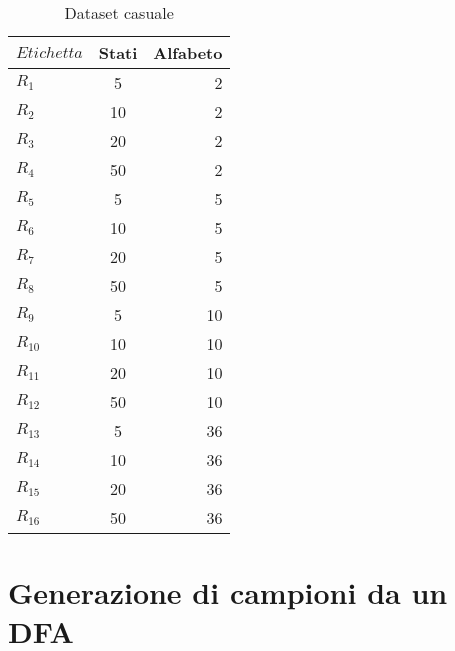 \begin{table}[htp]
\centering 
\begin{tabular}{lcr} 
\toprule
$Etichetta$ & Stati & Alfabeto  \\
 \midrule
 $R_{1}$ & 5 & 2 \\
 $R_{2}$ & 10 & 2  \\
 $R_{3}$ & 20 & 2  \\
 $R_{4}$ & 50 & 2\\
 $R_{5}$ & 5 & 5\\
  $R_{6}$ & 10 & 5  \\
 
 $R_{7}$ & 20 & 5  \\

 $R_{8}$ & 50 & 5 \\
 
  $R_{9}$ & 5 & 10  \\

 $R_{10}$ & 10 & 10  \\
 $R_{11}$ & 20 & 10\\
 
 $R_{12}$ & 50 & 10 \\
 
 $R_{13}$ & 5 & 36 \\
    
 $R_{14}$ & 10 & 36 \\
 
 $R_{15}$ & 20 & 36 \\

 $R_{16}$ & 50 & 36 \\
 \bottomrule
\end{tabular}

 \caption[Dataset casuale]{Dataset casuale}

\end{table} 

\section[Gen. campioni da DFA]{Generazione di campioni da un DFA}
\label{sec:gensam}

